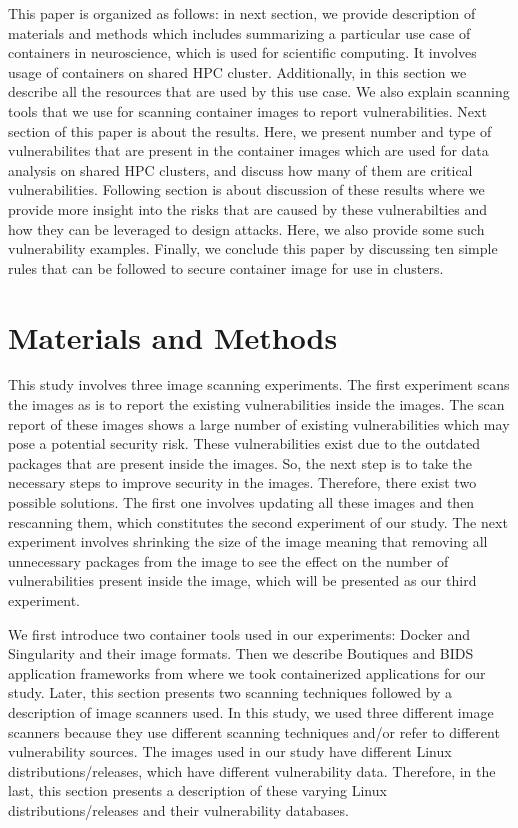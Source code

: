 \documentclass[a4paper,num-refs]{oup-contemporary}
\begin{document}
This paper is organized as follows: in next section, we provide description
of materials and methods which includes summarizing a particular use case of
containers in neuroscience, which is used for scientific computing. It involves
usage of containers on shared HPC cluster. Additionally, in this section we
describe all the resources that are used by this use case. We also explain
scanning tools that we use for scanning container images to report
vulnerabilities. Next section of this paper is about the results. Here, we
present number and type of vulnerabilites that are present in the container images
which are used for data analysis on shared HPC clusters, and discuss how many of them are
critical vulnerabilities. Following section is about discussion of these results
where we provide more insight into the risks that are caused by these vulnerabilties
and how they can be leveraged to design attacks. Here, we also provide some such
vulnerability examples. Finally, we conclude this paper by discussing ten simple
rules that can be followed to secure container image for use in clusters.

\section{Materials and Methods}

This study involves three image scanning experiments.
The first experiment scans the images as is to report the existing vulnerabilities
inside the images. The scan report of
these images shows a large number of existing vulnerabilities which may pose
a potential security risk. These vulnerabilities exist due to the outdated
packages that are present inside the images. So, the next step is to
take the necessary steps to improve security in the images. Therefore, there exist
two possible solutions.
The first one involves updating
all these images and then rescanning them, which constitutes the second experiment of our study. The next 
experiment involves shrinking the size of the image
meaning that removing all unnecessary packages from the image to see the effect on the number of
vulnerabilities present inside the image, which will be presented as our third experiment.

We first
introduce two container tools used in our experiments: Docker and
Singularity and their image formats. Then we describe Boutiques and BIDS application frameworks
from where we took containerized applications for our study. 
Later, this section
presents two scanning techniques followed by a description of image scanners used.
In this study, we used three different image scanners because they
use different scanning techniques and/or refer to different vulnerability sources.
The images used in our study have different Linux distributions/releases, which have
different vulnerability data. Therefore, in the last, this section presents a
description of these varying Linux distributions/releases and their
vulnerability databases.
\end{document}
